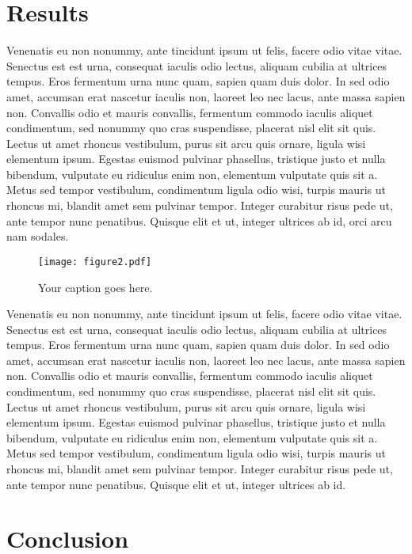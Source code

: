 \documentclass[twocolumn,prb,amsmath,amssymb,amsfonts]{revtex4}
\begin{document}
\section{Results}
Venenatis eu non nonummy, ante tincidunt ipsum ut felis, facere odio vitae vitae. Senectus est est urna, consequat iaculis odio lectus, aliquam cubilia at ultrices tempus. Eros fermentum urna nunc quam, sapien quam duis dolor. In sed odio amet, accumsan erat nascetur iaculis non, laoreet leo nec lacus, ante massa sapien non. Convallis odio et mauris convallis, fermentum commodo iaculis aliquet condimentum, sed nonummy quo cras suspendisse, placerat nisl elit sit quis. Lectus ut amet rhoncus vestibulum, purus sit arcu quis ornare, ligula wisi elementum ipsum. Egestas euismod pulvinar phasellus, tristique justo et nulla bibendum, vulputate eu ridiculus enim non, elementum vulputate quis sit a. Metus sed tempor vestibulum, condimentum ligula odio wisi, turpis mauris ut rhoncus mi, blandit amet sem pulvinar tempor. Integer curabitur risus pede ut, ante tempor nunc penatibus. Quisque elit et ut, integer ultrices ab id, orci arcu nam sodales.

\begin{figure}
\texttt{[image: figure2.pdf]}
\caption{Your caption goes here.}
\end{figure}

Venenatis eu non nonummy, ante tincidunt ipsum ut felis, facere odio vitae vitae. Senectus est est urna, consequat iaculis odio lectus, aliquam cubilia at ultrices tempus. Eros fermentum urna nunc quam, sapien quam duis dolor. In sed odio amet, accumsan erat nascetur iaculis non, laoreet leo nec lacus, ante massa sapien non. Convallis odio et mauris convallis, fermentum commodo iaculis aliquet condimentum, sed nonummy quo cras suspendisse, placerat nisl elit sit quis. Lectus ut amet rhoncus vestibulum, purus sit arcu quis ornare, ligula wisi elementum ipsum. Egestas euismod pulvinar phasellus, tristique justo et nulla bibendum, vulputate eu ridiculus enim non, elementum vulputate quis sit a. Metus sed tempor vestibulum, condimentum ligula odio wisi, turpis mauris ut rhoncus mi, blandit amet sem pulvinar tempor. Integer curabitur risus pede ut, ante tempor nunc penatibus. Quisque elit et ut, integer ultrices ab id.


\section{Conclusion}
\end{document}
